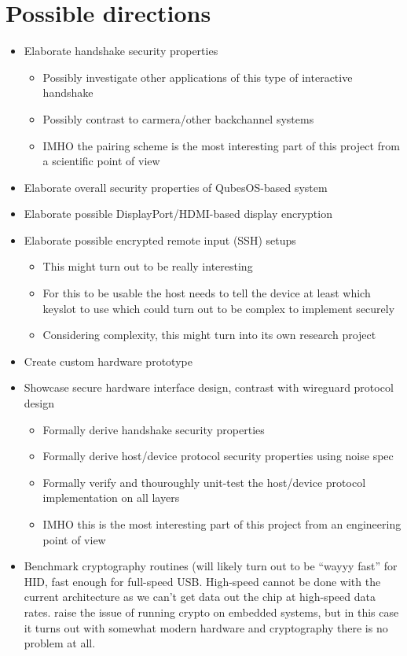 \documentclass[12pt,a4paper,notitlepage]{article}
\begin{document}
\section{Possible directions}
\begin{itemize}
    \item Elaborate handshake security properties
        \begin{itemize}
            \item Possibly investigate other applications of this type of interactive handshake
            \item Possibly contrast to carmera/other backchannel systems
            \item IMHO the pairing scheme is the most interesting part of this project from a scientific point of view
        \end{itemize}
    \item Elaborate overall security properties of QubesOS-based system
    \item Elaborate possible DisplayPort/HDMI-based display encryption
    \item Elaborate possible encrypted remote input (SSH) setups
        \begin{itemize}
            \item This might turn out to be really interesting
            \item For this to be usable the host needs to tell the device at least which keyslot to use which could turn
                out to be complex to implement securely
            \item Considering complexity, this might turn into its own research project
        \end{itemize}
    \item Create custom hardware prototype
    \item Showcase secure hardware interface design, contrast with wireguard protocol design
        \begin{itemize}
            \item Formally derive handshake security properties
            \item Formally derive host/device protocol security properties using noise spec
            \item Formally verify and thouroughly unit-test the host/device protocol implementation on all layers
            \item IMHO this is the most interesting part of this project from an engineering point of view
        \end{itemize}
    \item Benchmark cryptography routines (will likely turn out to be ``wayyy fast'' for HID, fast enough for full-speed
        USB. High-speed cannot be done with the current architecture as we can't get data out the chip at high-speed
        data rates. \textcite{srivaths01} raise the issue of running crypto on embedded systems, but in this case it
        turns out with somewhat modern hardware and cryptography there is no problem at all.
\end{itemize}
\end{document}
